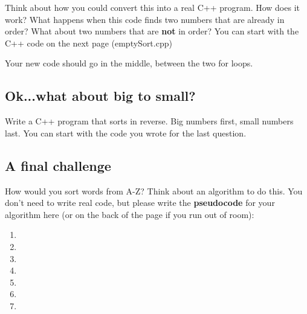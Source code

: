 \documentclass[a4paper,12pt]{article} %
\begin{document}
\vspace{5mm}


\noindent
Think about how you could convert this into a real C++ program. How does it work? What happens when this code finds two numbers that are already in order? What about two numbers that are \textbf{not} in order? You can start with the C++ code on the next page (emptySort.cpp)

\clearpage

\vspace{5mm}

\vspace{5mm}

\noindent
Your new code should go in the middle, between the two for loops. 

\subsection{Ok...what about big to small?}

Write a C++ program that sorts in reverse. Big numbers first, small numbers last. You can start with the code you wrote for the last question.

\subsection{A final challenge}

How would you sort words from A-Z? Think about an algorithm to do this. You don't need to write real code, but please write the \textbf{pseudocode} for your algorithm here (or on the back of the page if you run out of room): 

\begin{enumerate}
\item
\item
\item
\item
\item
\item
\item
\end{enumerate}
\end{document}
